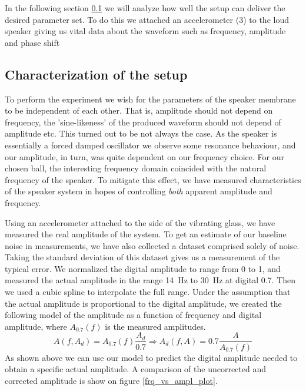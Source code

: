 \documentclass[12pt,oneside,a4paper]{article}
\numberwithin{equation}{section}
\begin{document}
{{{{In the following section \ref{Characterization} we will analyze how well the setup can deliver the desired parameter set. To do this we attached an accelerometer (3) to the loud speaker giving us vital data about the waveform such as frequency, amplitude and phase shift 

\subsection{Characterization of the setup}
\label{Characterization}
To perform the experiment we wish for the parameters of the speaker membrane to be independent of each other. That is, amplitude should not depend on frequency, the 'sine-likeness' of the produced waveform should not depend of amplitude etc. This turned out to be not always the case. As the speaker is essentially a forced damped oscillator we observe some resonance behaviour, and our amplitude, in turn, was quite dependent on our frequency choice. For our chosen ball, the interesting frequency domain coincided with the natural frequency of the speaker. To mitigate this effect, we have measured characteristics of the speaker system in hopes of controlling \emph{both} apparent amplitude and frequency.  

Using an accelerometer attached to the side of the vibrating glass, we have measured the real amplitude of the system. To get an estimate of our baseline noise in measurements, we have also collected a dataset comprised solely of noise. Taking the standard deviation of this dataset gives us a measurement of the typical error. We normalized the digital amplitude to range from 0 to 1, and measured the actual amplitude in the range \SI{14}{Hz} to \SI{30}{Hz} at digital 0.7. Then we used a cubic spline to interpolate the full range. Under the assumption that the actual amplitude is proportional to the digital amplitude, we created the following model of the amplitude as a function of frequency and digital amplitude, where $A_{0.7}(f)$ is the measured amplitudes.
\begin{equation}
	A(f,A_{d}) = A_{0.7}(f)\frac{A_{d}}{0.7} \Rightarrow A_d(f,A) = 0.7\frac{A}{A_{0.7}(f)}
	\label{ampl_model}
\end{equation}
As shown above we can use our model to predict the digital amplitude needed to obtain a specific actual amplitude. A comparison of the uncorrected and corrected amplitude is show on figure \ref{frq_vs_ampl_plot}.

}}}}
\end{document}
